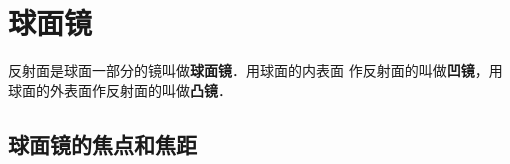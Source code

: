 \begin{enumerate}
\begin{figure}[htp]
\begin{minipage}[t]{0.48\textwidth}
\begin{tikzpicture}[>=latex]
\end{tikzpicture}
        \caption{}
        \end{minipage}
        \end{figure}
\end{enumerate}
    
\section{球面镜}
反射面是球面一部分的镜叫做\textbf{球面镜}．用球面的内表面
作反射面的叫做\textbf{凹镜}，用球面的外表面作反射面的叫做\textbf{凸镜}．

\subsection{球面镜的焦点和焦距}

